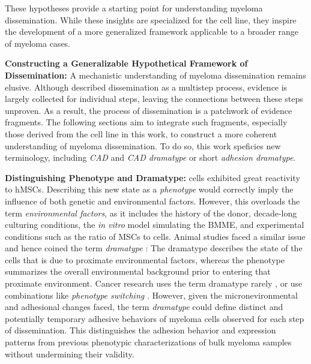 These hypotheses  provide a
starting point for understanding myeloma dissemination. While these insights are
specialized for the \INA cell line, they inspire the development of a more
generalized framework applicable to a broader range of myeloma cases.



\textbf{Constructing a Generalizable Hypothetical Framework of Dissemination:}
A mechanistic understanding of myeloma dissemination remains elusive. Although
\citet{zeissigTumourDisseminationMultiple2020} described dissemination as a
multistep process, evidence is largely collected for individual steps, leaving
the connections between these steps unproven. As a result, the process of
dissemination is a patchwork of evidence fragments. The following sections aim
to integrate such fragments, especially those derived from the \INA cell line in
this work, to construct a more coherent understanding of myeloma dissemination.
To do so, this work speficies new terminology, including
\emph{\acf{CAD}}\footterm{\footcad}{\label{foot:cad}}
and \emph{\ac{CAD} dramatype}\footterm{\footcaddt}{\label{foot:caddt}}
or short \emph{adhesion dramatype}\footterm{\footadhesiondt}{\label{foot:adhesiondt}}.



\textbf{Distinguishing Phenotype and Dramatype:}
\INA cells exhibited great reactivity to \acp{hMSC}. Describing this new state
as a \emph{phenotype} would correctly imply the influence of both genetic and
environmental factors. However, this overloads the term \emph{environmental
      factors}, as it includes the history of the donor, decade-long culturing
conditions, the \textit{in vitro} model simulating the \ac{BMME}, and
experimental conditions such as the ratio of \acp{MSC} to \INA cells. Animal
studies faced a similar issue and hence coined the term
\emph{dramatype}
\cite{zutphenPrinciplesLaboratoryAnimal2001}: The dramatype describes the state
of the cells that is due to proximate environmental factors, whereas the
phenotype summarizes the overall environmental background prior to entering that
proximate environment. Cancer research uses the term dramatype rarely
\cite{hinoStudiesFamilialTumors2004}, or use combinations like \emph{phenotype
      switching} \cite{woutersRobustGeneExpression2020}. However, given the
micronevironmental and adhesional changes faced, the term \emph{dramatype} could
define distinct and potentially temporary adhesive behaviors of
myeloma cells observed for each step of dissemination. This distinguishes the
adhesion behavior and expression patterns from previous phenotypic
characterizations of bulk myeloma samples without undermining their validity.



